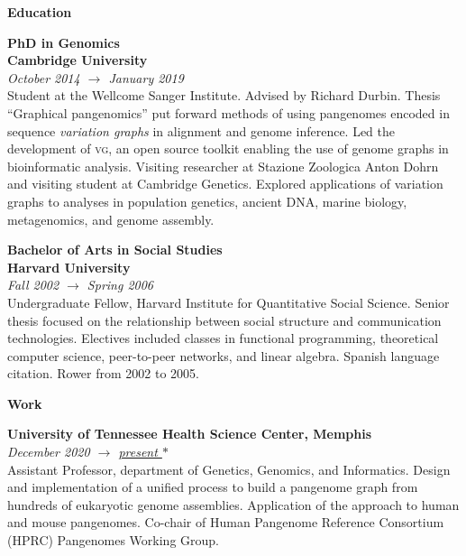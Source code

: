 \documentclass[11pt,hidelinks,letterpaper]{article}
\begin{document}
\begin{comment}
{\large
  I am a computational biologist. I work as an assistant professor at the University of Tennessee Health Science Center in Memphis.
  I started in quantitative social science, then moved to genomes, focusing on their variation.
  I learned the importance of open-source software through studying collaboration, which led me to bioinformatics.
  Now, I'm researching how to synthesize DNA as easily as we read it.
}
\end{comment}


\hfill \break
\hfill \break
\noindent
{\LARGE \bf Education}

\hfill \break
\noindent
{\large \bf PhD in Genomics \\
  Cambridge University
} \\
\emph{October 2014 $\to$ January 2019} \\
\noindent
Student at the Wellcome Sanger Institute.
Advised by Richard Durbin.
Thesis ``Graphical pangenomics'' put forward methods of using pangenomes encoded in sequence \emph{variation graphs} in alignment and genome inference.
Led the development of \textsc{vg}, an open source toolkit enabling the use of genome graphs in bioinformatic analysis.
Visiting researcher at Stazione Zoologica Anton Dohrn and visiting student at Cambridge Genetics.
Explored applications of variation graphs to analyses in population genetics, ancient DNA, marine biology, metagenomics, and genome assembly.

\hfill \break
\noindent
{\large \bf Bachelor of Arts in Social Studies \\ Harvard University} \\
\emph{Fall 2002 $\to$ Spring 2006} \\
\noindent
Undergraduate Fellow, Harvard Institute for Quantitative Social Science. Senior thesis focused on the relationship between social structure and communication technologies. Electives included classes in functional programming, theoretical computer science, peer-to-peer networks, and linear algebra. Spanish language citation. Rower from 2002 to 2005.


\hfill \break
\hfill \break
\noindent
{\LARGE \bf Work}

\hfill \break
\noindent
{\large \bf University of Tennessee Health Science Center, Memphis} \\
\emph{December 2020 $\to$ \underline{present {\LARGE $\ast$}}} \\
\noindent
Assistant Professor, department of Genetics, Genomics, and Informatics.
Design and implementation of a unified process to build a pangenome graph from hundreds of eukaryotic genome assemblies.
Application of the approach to human and mouse pangenomes.
Co-chair of Human Pangenome Reference Consortium (HPRC) Pangenomes Working Group.
\end{document}
